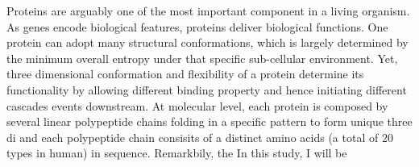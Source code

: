 Proteins are arguably one of the most important component in a living organism. As genes encode biological features, proteins deliver biological functions. One protein can adopt many structural conformations, which is largely determined by the minimum overall entropy under that specific sub-cellular environment. Yet, three dimensional conformation and flexibility of a protein determine its functionality by allowing different binding property and hence initiating different cascades events downstream. At molecular level, each protein is composed by several linear polypeptide chains folding in a specific pattern to form unique three di and each polypeptide chain consisits of a distinct amino acids (a total of 20 types in human) in sequence. Remarkbily, the  In this study, I will be 